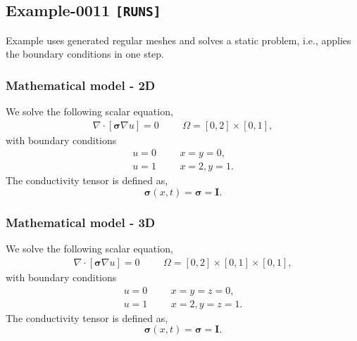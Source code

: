 %
\clearpage
%
\subsection{Example-0011 \texttt{[RUNS]}}
%
Example uses generated regular meshes and solves a static problem, i.e., applies
the boundary conditions in one step.
%
%
\subsubsection{Mathematical model - 2D}
%
We solve the following scalar equation,
%
\begin{align}
    \nabla \cdot [\boldsymbol{\sigma} \nabla u] = 0 & &&\Omega = [0, 2] \times [0, 1],
\end{align}
%
with boundary conditions
%
\begin{align}
    u = 0 & &&x = y = 0, \\
    u = 1 & &&x = 2, y = 1.
\end{align}
%
The conductivity tensor is defined as,
%
\begin{equation}
    \boldsymbol{\sigma} (x, t) = \boldsymbol{\sigma} = \boldsymbol{I}.
\end{equation}
%
%
\subsubsection{Mathematical model - 3D}
%
We solve the following scalar equation,
%
\begin{align}
    \nabla \cdot [\boldsymbol{\sigma} \nabla u] = 0 & &&\Omega = [0, 2] \times [0, 1] \times [0, 1],
\end{align}
%
with boundary conditions
%
\begin{align}
    u = 0 & &&x = y = z = 0, \\
    u = 1 & &&x = 2, y = z = 1.
\end{align}
%
The conductivity tensor is defined as,
%
\begin{equation}
    \boldsymbol{\sigma} (x, t) = \boldsymbol{\sigma} = \boldsymbol{I}.
\end{equation}
%
%

